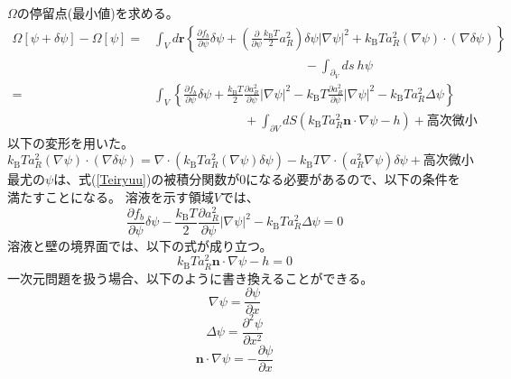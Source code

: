 \documentclass[a4paper,12pt, oneside, openany]{jsbook}
\begin{document}
$\Omega$の停留点(最小値)を求める。
\begin{equation}
\begin{split}\label{Teiryuu}
  \Omega[\psi+\delta\psi]-\Omega[\psi]=&\int_V d\boldsymbol{r}\left\{\frac{\partial f_b}{\partial \psi}\delta\psi+\left(\frac{\partial}{\partial \psi}\frac{k_\mathrm{B}T}{2}a^2_R\right)\delta\psi|\nabla\psi|^2+k_\mathrm{B}Ta^2_R(\nabla\psi)\cdot(\nabla\delta\psi)\right\}\\
 &          \hspace{5cm} -\int_{\partial_V}ds\ h\psi\\
  =&\int_V\left\{  \frac{\partial f_b}{\partial \psi}\delta\psi+\frac{k_\mathrm{B}T}{2}\frac{\partial a^2_R }{\partial \psi}|\nabla\psi|^2-k_\mathrm{B}T\frac{\partial a^2_R}{\partial \psi}|\nabla\psi|^2-k_\mathrm{B}Ta^2_R\Delta\psi\right\}\\
  &     \hspace{3cm}+\int_{\partial V}dS\left(k_\mathrm{B}Ta^2_R\boldsymbol{n}\cdot\nabla\psi-h\right)+高次微小
\end{split}
\end{equation}
以下の変形を用いた。
\begin{equation}
k_\mathrm{B}Ta^2_R(\nabla\psi)\cdot(\nabla\delta\psi)=\nabla\cdot\left(k_\mathrm{B}Ta^2_R(\nabla\psi)\delta\psi\right)-k_\mathrm{B}T\nabla\cdot(a^2_R\nabla\psi)\delta\psi+高次微小
\end{equation}
最尤の$\psi$は、式(\ref{Teiryuu})の被積分関数が0になる必要があるので、以下の条件を満たすことになる。
溶液を示す領域$V$では、
\begin{equation}\label{Vnoryouiki}
  \frac{\partial f_b}{\partial \psi}\delta\psi-\frac{k_\mathrm{B}T}{2}\frac{\partial a^2_R }{\partial \psi}|\nabla\psi|^2-k_\mathrm{B}Ta^2_R\Delta\psi=0
\end{equation}
溶液と壁の境界面では、以下の式が成り立つ。
\begin{equation}\label{kyoukai}
  k_\mathrm{B}Ta^2_R\boldsymbol{n}\cdot\nabla\psi-h=0
\end{equation}
一次元問題を扱う場合、以下のように書き換えることができる。
\begin{equation}
  \nabla\psi=\frac{\partial \psi}{\partial x}
\end{equation}
\begin{equation}
  \Delta\psi=\frac{\partial^2\psi}{\partial x^2}
\end{equation}
\begin{equation}
  \boldsymbol{n}\cdot\nabla\psi=-\frac{\partial \psi}{\partial x}
\end{equation}
\end{document}
